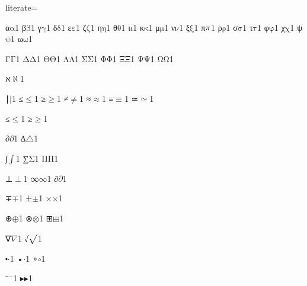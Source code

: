 {%
literate=
  
{α}{{\ensuremath{\mathrm{\alpha}}}}1
{β}{{\ensuremath{\mathrm{\beta}}}}1
{γ}{{\ensuremath{\mathrm{\gamma}}}}1
{δ}{{\ensuremath{\mathrm{\delta}}}}1
{ε}{{\ensuremath{\mathrm{\varepsilon}}}}1
{ζ}{{\ensuremath{\mathrm{\zeta}}}}1
{η}{{\ensuremath{\mathrm{\eta}}}}1
{θ}{{\ensuremath{\mathrm{\theta}}}}1
{ι}{{\ensuremath{\mathrm{\iota}}}}1
{κ}{{\ensuremath{\mathrm{\kappa}}}}1
{μ}{{\ensuremath{\mathrm{\mu}}}}1
{ν}{{\ensuremath{\mathrm{\nu}}}}1
{ξ}{{\ensuremath{\mathrm{\xi}}}}1
{π}{{\ensuremath{\mathrm{\mathnormal{\pi}}}}}1
{ρ}{{\ensuremath{\mathrm{\rho}}}}1
{σ}{{\ensuremath{\mathrm{\sigma}}}}1
{τ}{{\ensuremath{\mathrm{\tau}}}}1
{φ}{{\ensuremath{\mathrm{\varphi}}}}1
{χ}{{\ensuremath{\mathrm{\chi}}}}1
{ψ}{{\ensuremath{\mathrm{\psi}}}}1
{ω}{{\ensuremath{\mathrm{\omega}}}}1

{Γ}{{\ensuremath{\mathrm{\Gamma}}}}1
{Δ}{{\ensuremath{\mathrm{\Delta}}}}1
{Θ}{{\ensuremath{\mathrm{\Theta}}}}1
{Λ}{{\ensuremath{\mathrm{\Lambda}}}}1
{Σ}{{\ensuremath{\mathrm{\Sigma}}}}1
{Φ}{{\ensuremath{\mathrm{\Phi}}}}1
{Ξ}{{\ensuremath{\mathrm{\Xi}}}}1
{Ψ}{{\ensuremath{\mathrm{\Psi}}}}1
{Ω}{{\ensuremath{\mathrm{\Omega}}}}1

{ℵ}{{\ensuremath{\aleph}}}1

{∣}{{\ensuremath{\mid}}}1
{≤}{{\ensuremath{\leq}}}1
{≥}{{\ensuremath{\geq}}}1
{≠}{{\ensuremath{\neq}}}1
{≈}{{\ensuremath{\approx}}}1
{≡}{{\ensuremath{\equiv}}}1
{≃}{{\ensuremath{\simeq}}}1

{≤}{{\ensuremath{\leq}}}1
{≥}{{\ensuremath{\geq}}}1

{∂}{{\ensuremath{\partial}}}1
{∆}{{\ensuremath{\triangle}}}1 %

{∫}{{\ensuremath{\int}}}1
{∑}{{\ensuremath{\mathrm{\Sigma}}}}1
{Π}{{\ensuremath{\mathrm{\Pi}}}}1

{⊥}{{\ensuremath{\perp}}}1
{∞}{{\ensuremath{\infty}}}1
{∂}{{\ensuremath{\partial}}}1

{∓}{{\ensuremath{\mp}}}1
{±}{{\ensuremath{\pm}}}1
{×}{{\ensuremath{\times}}}1

{⊕}{{\ensuremath{\oplus}}}1
{⊗}{{\ensuremath{\otimes}}}1
{⊞}{{\ensuremath{\boxplus}}}1

{∇}{{\ensuremath{\nabla}}}1
{√}{{\ensuremath{\sqrt{\mathstrut}}}}1

{⬝}{{\ensuremath{\cdot}}}1
{•}{{\ensuremath{\cdot}}}1
{∘}{{\ensuremath{\circ}}}1

{⁻}{{\ensuremath{^{-}}}}1
{▸}{{\ensuremath{\blacktriangleright}}}1

}
